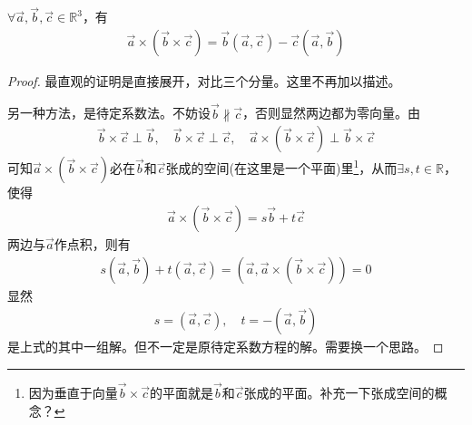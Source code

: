 \begin{lemma}
  $\forall \vec a,\vec b,\vec c\in\mathbb{R}^3$，有
  \begin{align*}
    \vec a\times(\vec b\times \vec c)=\vec b(\vec a,\vec c) - \vec c(\vec a,\vec b)
  \end{align*}
\end{lemma}
\begin{proof}
  最直观的证明是直接展开，对比三个分量。这里不再加以描述。

  另一种方法，是待定系数法。不妨设$\vec b\not\parallel\vec c$，否则显然两边都为零向量。由
  \begin{align*}
    \vec b\times\vec c\perp \vec b,\quad \vec b\times\vec c\perp \vec c,\quad
    \vec a\times(\vec b\times\vec c)\perp \vec b\times \vec c
  \end{align*}
  可知$\vec a\times(\vec b\times\vec c)$必在$\vec b$和$\vec c$张成的空间(在这里是一个平面)里\footnote{因为垂直于向量$\vec b\times\vec c$的平面就是$\vec b$和$\vec c$张成的平面。\color{red}补充一下张成空间的概念？}，从而$\exists s,t\in\mathbb{R}$，使得
  \begin{align*}
    \vec a\times(\vec b\times\vec c) = s\vec b +t\vec c
  \end{align*}
  两边与$\vec a$作点积，则有
  \begin{align*}
    s(\vec a,\vec b)+t(\vec a,\vec c)=(\vec a, \vec a\times(\vec b\times\vec c))=0
  \end{align*}
  显然
  \begin{align*}
    s=(\vec a,\vec c),\quad
    t=-(\vec a,\vec b)
  \end{align*}
  是上式的其中一组解。{\color{red}但不一定是原待定系数方程的解。需要换一个思路。}


\end{proof}
